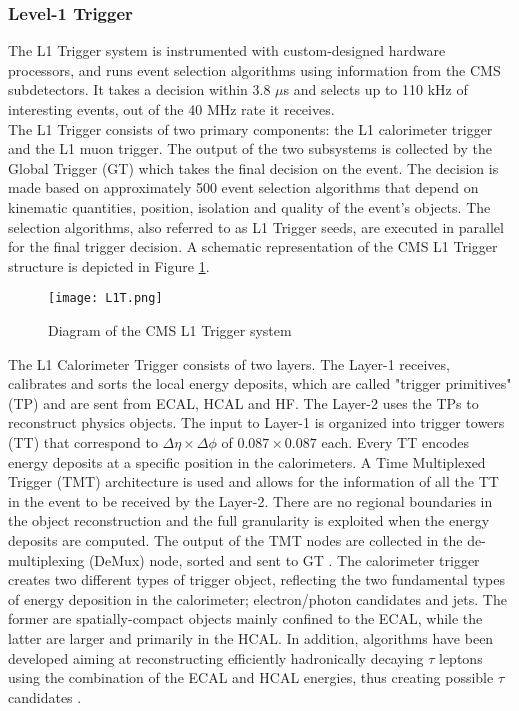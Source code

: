 \subsubsection{\label{sec:exp_CMS_trigger_1} Level-1 Trigger}
\noindent The L1 Trigger system is instrumented with custom-designed hardware processors, and runs event selection algorithms using information from the CMS subdetectors. It takes a decision within 3.8 $\mu$s and selects up to 110 kHz of interesting events, out of the 40 MHz rate it receives.\\
\indent The L1 Trigger consists of two primary components: the L1 calorimeter trigger and the L1 muon trigger. The output of the two subsystems is collected by the Global Trigger (GT) which takes the final decision on the event. The decision is made based on approximately 500 event selection algorithms that depend on kinematic quantities, position, isolation and quality of the event’s objects. The selection algorithms, also referred to as L1 Trigger seeds, are executed in parallel for the final trigger decision. A schematic representation of the CMS L1 Trigger structure is depicted in Figure \ref{fig:L1T}.\\
\begin{figure}[H]
    \centering
    \texttt{[image: L1T.png]}
    \caption{Diagram of the CMS L1 Trigger system \cite{Sirunyan_2020}}
    \label{fig:L1T}
\end{figure}
\indent The L1 Calorimeter Trigger consists of two layers. The Layer-1 receives, calibrates and sorts the local energy deposits, which are called "trigger primitives" (TP) and are sent from ECAL, HCAL and HF. The Layer-2 uses the TPs to reconstruct physics objects. The input to Layer-1 is organized into trigger towers (TT) that correspond to $\Delta\eta \times\Delta\phi$ of $0.087 \times 0.087$ each. Every TT encodes energy deposits at a specific position in the calorimeters. A Time Multiplexed Trigger (TMT) architecture is used and allows for the information of all the TT in the event to be received by the Layer-2. There are no regional boundaries in the object reconstruction and the full granularity is exploited when the energy deposits are computed. The output of the TMT nodes are collected in the de-multiplexing (DeMux) node, sorted and sent to GT \cite{M_Baber_2014}. The calorimeter trigger creates two different types of trigger object, reflecting the two fundamental types of energy deposition in the calorimeter; electron/photon candidates and jets. The former are spatially-compact objects mainly confined to the ECAL, while the latter are larger and primarily in the HCAL. In addition, algorithms have been developed aiming at reconstructing efficiently hadronically decaying $\tau$ leptons using the combination of the ECAL and HCAL energies, thus creating possible $\tau$ candidates \cite{Zabi_2016}.

